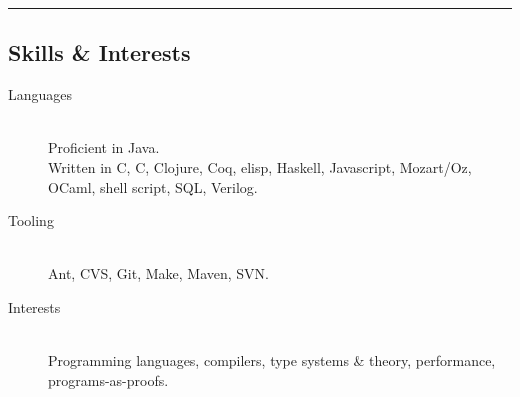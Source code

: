 \documentclass[10pt,letterpaper]{article}
\newenvironment{indentsection}[1]%
{\begin{list}{}%
	{\setlength{\leftmargin}{#1}}%
	\item[]%
}
{\end{list}}
\newcommand{\CPP}
{C\nolinebreak[4]\hspace{-.05em}\raisebox{.22ex}{\footnotesize\bf ++}}
\begin{document}
\hrule
\vspace{-0.4em}
\subsection*{Skills \& Interests}

\begin{indentsection}{\parindent}
\begin{description}
	\item[Languages] \hfill \\
	Proficient in Java. \\
	Written in C, \CPP, Clojure, Coq, elisp, Haskell, Javascript, Mozart/Oz, OCaml, shell script, SQL, Verilog.
	\item[Tooling] \hfill \\
	Ant, CVS, Git, Make, Maven, SVN.
	\item[Interests] \hfill \\
	Programming languages, compilers, type systems \& theory, performance, programs-as-proofs.
\end{description}
\end{indentsection}
\end{document}
